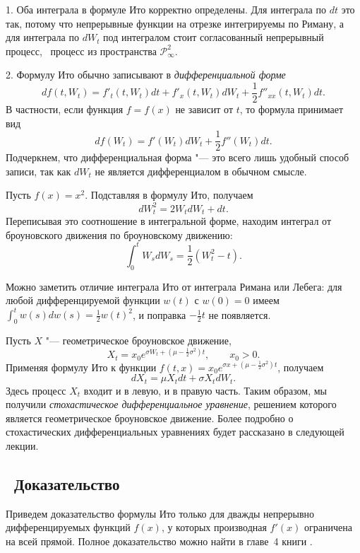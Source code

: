 \begin{remark}
1. Оба интеграла в формуле Ито корректно определены.
Для интеграла по $dt$ это так, потому что непрерывные функции на отрезке интегрируемы по Риману, а для интеграла по $dW_t$ под интегралом стоит согласованный непрерывный процесс, \te\ процесс из пространства $\mathcal{P}^2_\infty$.

2. Формулу Ито обычно записывают в \emph{дифференциальной форме}
\[
d f(t,W_t) = f'_t(t,W_t) dt + f'_x(t,W_t) dW_t + \frac12 f''_{xx}(t,W_t) dt.
\]
В частности, если функция $f=f(x)$ не зависит от $t$, то формула принимает вид
\[
d f(W_t) = f'(W_t) dW_t + \frac12 f''(W_t) dt.
\]
Подчеркнем, что дифференциальная форма "--- это всего лишь удобный способ записи, так как $dW_t$ не является дифференциалом в обычном смысле.
\end{remark}

\begin{example}
\label{7:e:WdW}
Пусть $f(x) = x^2$.
Подставляя в формулу Ито, получаем
\[
d W_t^2 = 2 W_t d W_t + dt.
\]
Переписывая это соотношение в интегральной форме, находим интеграл от броуновского движения по броуновскому движению:
\[
\int_0^t W_s d W_s = \frac12 (W_t^2 - t).
\]

Можно заметить отличие интеграла Ито от интеграла Римана или Лебега: для любой дифференцируемой функции $w(t)$ с $w(0)=0$ имеем $\int_0^t w(s) d w(s) = \frac12 w(t)^2$, и поправка $-\frac12 t$ не появляется.
\end{example}

\begin{example}
Пусть $X$ "--- геометрическое броуновское движение, \te
\[
X_t = x_0e^{\sigma W_t + (\mu - \frac12 \sigma^2)t}, \qquad x_0>0.
\]
Применяя формулу Ито к функции $f(t,x) = x_0 e^{\sigma x + (\mu - \frac12 \sigma^2)t}$, получаем
\[
d X_t = \mu X_t dt + \sigma X_t d W_t.
\]
Здесь процесс $X_t$ входит и в левую, и в правую часть.
Таким образом, мы получили \emph{стохастическое дифференциальное уравнение}, решением которого является геометрическое броуновское движение.
Более подробно о стохастических дифференциальных уравнениях будет рассказано в следующей лекции.
\end{example}


\subsection{\difficult\ Доказательство}

Приведем доказательство формулы Ито только для дважды непрерывно дифференцируемых функций $f(x)$, у которых производная $f'(x)$ ограничена на всей прямой.
Полное доказательство можно найти в главе~4 книги \cite{LiptserShiryaev74}.

